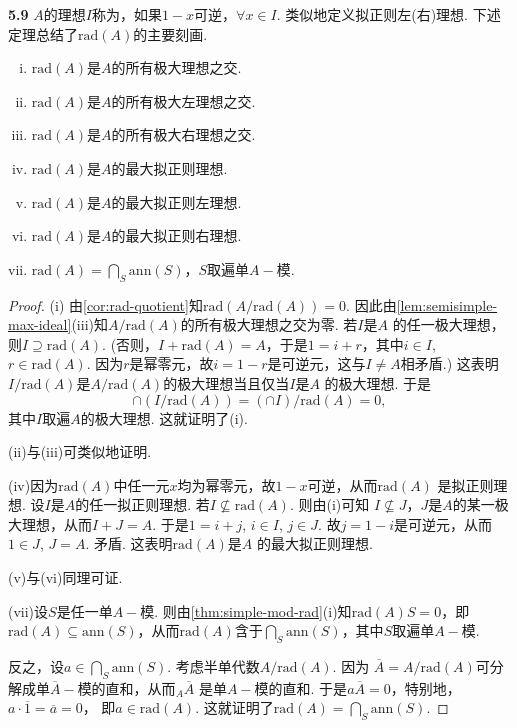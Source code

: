 \textbf{5.9} $A$的理想$I$称为，如果$1-x$可逆，$\forall x \in I$.
类似地定义拟正则左(右)理想. 下述定理总结了$\mathrm{rad}(A)$的主要刻画.

\begin{theorem}
    \begin{enumerate}[(i)]
        \item $\mathrm{rad}(A)$是$A$的所有极大理想之交.
        \item $\mathrm{rad}(A)$是$A$的所有极大左理想之交.
        \item $\mathrm{rad}(A)$是$A$的所有极大右理想之交.
        \item $\mathrm{rad}(A)$是$A$的最大拟正则理想.
        \item $\mathrm{rad}(A)$是$A$的最大拟正则左理想.
        \item $\mathrm{rad}(A)$是$A$的最大拟正则右理想.
        \item $\mathrm{rad}(A) = \bigcap\limits_S \mathrm{ann}(S)$，$S$取遍单$A-\!\!$模.
    \end{enumerate}
\end{theorem}

\begin{proof}
    \noindent (i) 由\cref{cor:rad-quotient}知$\mathrm{rad}(A/\mathrm{rad}(A)) = 0$. 因此由\cref{lem:semisimple-max-ideal}(iii)知$A/\mathrm{rad}(A)$的所有极大理想之交为零. 若$I$是$A$
    的任一极大理想，则$I \supseteq \mathrm{rad}(A)$. (否则，$I + \mathrm{rad}(A) = A$，于是$1 = i +
    r$，其中$i \in I$, $r \in \mathrm{rad}(A)$. 因为$r$是幂零元，故$i = 1-r$是可逆元，这与$I
    \neq A$相矛盾.) 这表明$I/\mathrm{rad}(A)$是$A/\mathrm{rad}(A)$的极大理想当且仅当$I$是$A$
    的极大理想. 于是
    \[ \cap (I/\mathrm{rad}(A)) = (\cap I)/\mathrm{rad}(A) = 0, \]
    其中$I$取遍$A$的极大理想. 这就证明了(i).\par
    \noindent (ii)与(iii)可类似地证明.\par
    \noindent (iv)因为$\mathrm{rad}(A)$中任一元$x$均为幂零元，故$1-x$可逆，从而$\mathrm{rad}(A)$
    是拟正则理想. 设$I$是$A$的任一拟正则理想. 若$I \not\subseteq \mathrm{rad}(A)$. 则由(i)可知
    $I \not\subseteq J$，$J$是$A$的某一极大理想，从而$I + J = A$. 于是$1 = i + j$, $i \in I$,
    $j \in J$. 故$j = 1-i$是可逆元，从而$1 \in J$, $J = A$. 矛盾. 这表明$\mathrm{rad}(A)$是$A$
    的最大拟正则理想.\par
    \noindent (v)与(vi)同理可证.\par
    \noindent (vii)设$S$是任一单$A-\!\!$模. 则由\cref{thm:simple-mod-rad}(i)知$\mathrm{rad}(A)S = 0$，即
    $\mathrm{rad}(A) \subseteq \mathrm{ann}(S)$，从而$\mathrm{rad}(A)$含于$\bigcap\limits_S
    \mathrm{ann}(S)$，其中$S$取遍单$A-\!\!$模.\par
    反之，设$a \in \bigcap\limits_S \mathrm{ann}(S)$. 考虑半单代数$A/\mathrm{rad}(A)$. 因为
    $\overline{A} = A/\mathrm{rad}(A)$可分解成单$\overline{A}-\!\!$模的直和，从而${}_A \overline{A}$
    是单$A-\!\!$模的直和. 于是$a\overline{A} = 0$，特别地，$a \cdot \overline{1} = \overline{a} = 0$，
    即$a \in \mathrm{rad}(A)$. 这就证明了$\mathrm{rad}(A) = \bigcap\limits_S \mathrm{ann}(S)$.
\end{proof}

